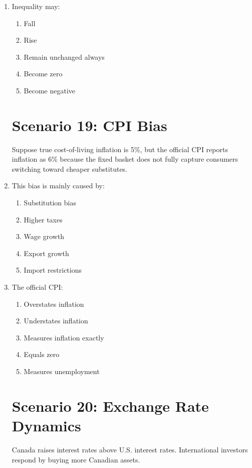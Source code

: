 \documentclass[12pt]{article}
\begin{document}
\begin{enumerate}[label=\textbf{\arabic*.}]
\item Inequality may:
\begin{enumerate}[label=\Alph*.]
\item Fall
\item Rise
\item Remain unchanged always
\item Become zero
\item Become negative
\end{enumerate}

\section*{Scenario 19: CPI Bias}

Suppose true cost-of-living inflation is 5\%, but the official CPI reports inflation as 6\% because the fixed basket does not fully capture consumers switching toward cheaper substitutes.



\item This bias is mainly caused by:
\begin{enumerate}[label=\Alph*.]
\item Substitution bias
\item Higher taxes
\item Wage growth
\item Export growth
\item Import restrictions
\end{enumerate}

\item The official CPI:
\begin{enumerate}[label=\Alph*.]
\item Overstates inflation
\item Understates inflation
\item Measures inflation exactly
\item Equals zero
\item Measures unemployment
\end{enumerate}

\section*{Scenario 20: Exchange Rate Dynamics}

Canada raises interest rates above U.S. interest rates. International investors respond by buying more Canadian assets.


\end{enumerate}
\end{document}
